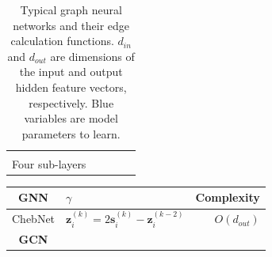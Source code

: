 \begin{table}
\begin{footnotesize}
\begin{tabular}{ccp{8em}p{22em}r}
\begin{scriptsize}
			\end{scriptsize}                                                                                            &
			\makecell[r]{$O(max(d_a, d_m, d_v) * K * d_{in})$ \\
                        Four sub-layers}\\
			\bottomrule
		\end{tabular}
	\end{footnotesize}
	\caption{Typical graph neural networks and their edge calculation functions.
		$d_{in}$ and $d_{out}$ are dimensions of the input and output hidden feature vectors, respectively.
		Blue variables are model parameters to learn.
	}
	\label{tab:gnn_overview_edge}
\end{table}

\begin{table}
	\begin{footnotesize}
		\begin{tabular}{cp{20em}r}
			\toprule
			GNN                                                                                                                                                                                                              &
			$\gamma$                                                                                                                                                                                                         &
			Complexity                                                                                                                                                                                                         \\ \midrule
			ChebNet \cite{defferrad2016_chebnet}                                                                                                                                                                             &
			$\boldsymbol{z}_i^{(k)} = 2\boldsymbol{s}^{(k)}_{i} - \boldsymbol{z}_i^{(k-2)}$                                                                                                                                  &
			$O(d_{out})$                                                                                                                                                                                                       \\
			\textbf{GCN} \cite{kipf2017_gcn}                                                                                                                                                                                 &

\end{tabular}
\end{footnotesize}
\end{table}
